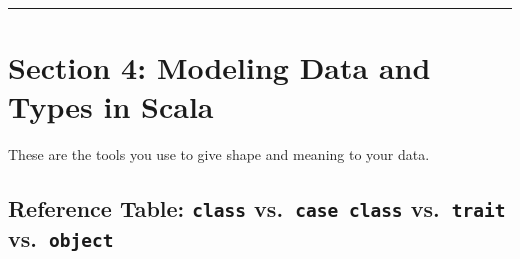 \documentclass[
  letterpaper,
  DIV=11,
  numbers=noendperiod]{scrreprt}
\begin{document}
\begin{center}\rule{0.5\linewidth}{0.5pt}\end{center}

\section{\texorpdfstring{\textbf{Section 4: Modeling Data and Types in
Scala}}{Section 4: Modeling Data and Types in Scala}}\label{section-4-modeling-data-and-types-in-scala}

These are the tools you use to give shape and meaning to your data.

\subsection{\texorpdfstring{\textbf{Reference Table: \texttt{class}
vs.~\texttt{case\ class} vs.~\texttt{trait}
vs.~\texttt{object}}}{Reference Table: class vs.~case class vs.~trait vs.~object}}\label{reference-table-class-vs.-case-class-vs.-trait-vs.-object}
\end{document}
